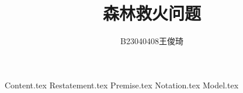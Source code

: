 \documentclass{article}     %
\title{森林救火问题}
\author{B23040408王俊琦}
\begin{document}
{Content.tex}
{Restatement.tex}
{Premise.tex}
{Notation.tex}
{Model.tex}
\end{document}
